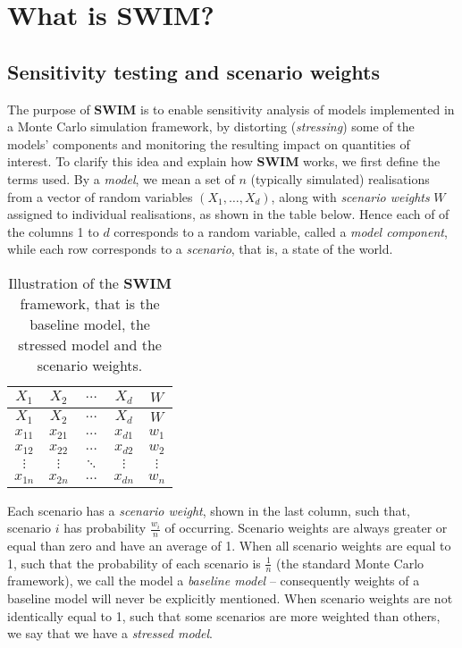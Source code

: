 \documentclass[
]{article}
\begin{document}
\hypertarget{Sec:Intro}{%
\section{\texorpdfstring{What is \textbf{SWIM}?}{What is SWIM?}}\label{Sec:Intro}}

\hypertarget{sensitivity-testing-and-scenario-weights}{%
\subsection{Sensitivity testing and scenario weights}\label{sensitivity-testing-and-scenario-weights}}

The purpose of \textbf{SWIM} is to enable sensitivity analysis of models implemented in a Monte Carlo simulation framework, by distorting (\emph{stressing}) some of the models' components and monitoring the resulting impact on quantities of interest.
To clarify this idea and explain how \textbf{SWIM} works, we first define the terms used. By a \emph{model}, we mean a set of \(n\) (typically simulated) realisations from a vector of random variables \((X_1,\dots,X_d)\), along with \emph{scenario weights} \(W\) assigned to individual realisations, as shown in the table below. Hence each of of the columns 1 to \(d\) corresponds to a random variable, called a \emph{model component}, while each row corresponds to a \emph{scenario}, that is, a state of the world.

\begin{longtable}[]{@{}ccccc@{}}
\caption{\label{tab:SWIMframework} Illustration of the \textbf{SWIM} framework, that is the baseline model, the stressed model and the scenario weights.}\tabularnewline
\toprule
\(X_1\) & \(X_2\) & \(\dots\) & \(X_d\) & \(W\)\tabularnewline
\midrule
\endfirsthead
\toprule
\(X_1\) & \(X_2\) & \(\dots\) & \(X_d\) & \(W\)\tabularnewline
\midrule
\endhead
\(x_{11}\) & \(x_{21}\) & \(\dots\) & \(x_{d1}\) & \(w_1\)\tabularnewline
\(x_{12}\) & \(x_{22}\) & \(\dots\) & \(x_{d2}\) & \(w_2\)\tabularnewline
\(\vdots\) & \(\vdots\) & \(\ddots\) & \(\vdots\) & \(\vdots\)\tabularnewline
\(x_{1n}\) & \(x_{2n}\) & \(\dots\) & \(x_{dn}\) & \(w_n\)\tabularnewline
\bottomrule
\end{longtable}

Each scenario has a \emph{scenario weight}, shown in the last column, such that, scenario \(i\) has probability \(\frac{w_i}{n}\) of occurring. Scenario weights are always greater or equal than zero and have an average of 1. When all scenario weights are equal to 1, such that the probability of each scenario is \(\frac 1 n\) (the standard Monte Carlo framework), we call the model a \emph{baseline model} -- consequently weights of a baseline model will never be explicitly mentioned. When scenario weights are not identically equal to 1, such that some scenarios are more weighted than others, we say that we have a \emph{stressed model}.
\end{document}
